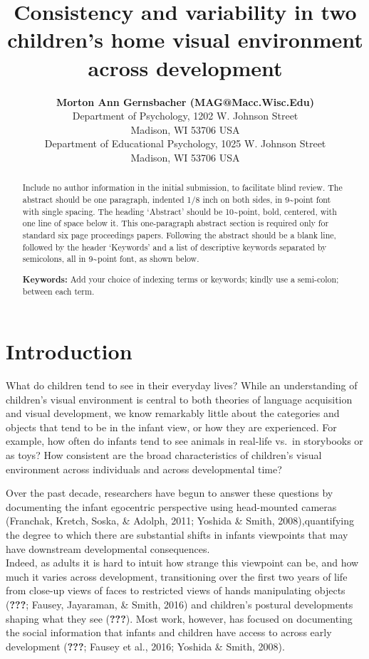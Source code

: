 \documentclass[10pt, letterpaper]{article}
\title{Consistency and variability in two children's home visual environment
across development}
\author{{\large \bf Morton Ann Gernsbacher (MAG@Macc.Wisc.Edu)} \\ Department of Psychology, 1202 W. Johnson Street \\ Madison, WI 53706 USA \AND {\large \bf Sharon J.~Derry (SDJ@Macc.Wisc.Edu)} \\ Department of Educational Psychology, 1025 W. Johnson Street \\ Madison, WI 53706 USA}
\begin{document}
\maketitle

\begin{abstract}
Include no author information in the initial submission, to facilitate
blind review. The abstract should be one paragraph, indented 1/8 inch on
both sides, in 9\textasciitilde{}point font with single spacing. The
heading `Abstract' should be 10\textasciitilde{}point, bold, centered,
with one line of space below it. This one-paragraph abstract section is
required only for standard six page proceedings papers. Following the
abstract should be a blank line, followed by the header `Keywords' and a
list of descriptive keywords separated by semicolons, all in
9\textasciitilde{}point font, as shown below.

\textbf{Keywords:}
Add your choice of indexing terms or keywords; kindly use a semi-colon;
between each term.
\end{abstract}

\section{Introduction}\label{introduction}

What do children tend to see in their everyday lives? While an
understanding of children's visual environment is central to both
theories of language acquisition and visual development, we know
remarkably little about the categories and objects that tend to be in
the infant view, or how they are experienced. For example, how often do
infants tend to see animals in real-life vs.~in storybooks or as toys?
How consistent are the broad characteristics of children's visual
environment across individuals and across developmental time?

Over the past decade, researchers have begun to answer these questions
by documenting the infant egocentric perspective using head-mounted
cameras (Franchak, Kretch, Soska, \& Adolph, 2011; Yoshida \& Smith,
2008),quantifying the degree to which there are substantial shifts in
infants viewpoints that may have downstream developmental
consequences.\\
Indeed, as adults it is hard to intuit how strange this viewpoint can
be, and how much it varies across development, transitioning over the
first two years of life from close-up views of faces to restricted views
of hands manipulating objects ({\textbf{???}}; Fausey, Jayaraman, \&
Smith, 2016) and children's postural developments shaping what they see
({\textbf{???}}). Most work, however, has focused on documenting the
social information that infants and children have access to across early
development ({\textbf{???}}; Fausey et al., 2016; Yoshida \& Smith,
2008).
\end{document}
